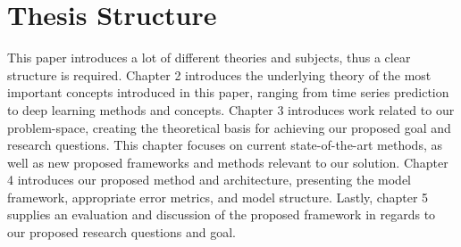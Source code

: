 
\section{Thesis Structure}
\label{sections:Introduction:Structure}

This paper introduces a lot of different theories and subjects,
thus a clear structure is required.
Chapter 2 introduces the underlying theory of the most important concepts introduced in this paper,
ranging from time series prediction to deep learning methods and concepts.
Chapter 3 introduces work related to our problem-space, creating the theoretical basis for achieving our proposed goal and research questions.
This chapter focuses on current state-of-the-art methods,
as well as new proposed frameworks and methods relevant to our solution.
Chapter 4 introduces our proposed method and architecture,
presenting the model framework, appropriate error metrics, and model structure.
Lastly, chapter 5 supplies an evaluation and discussion of the proposed framework in regards to our proposed research questions and goal.


\iffalse
This section provides the reader with an overview of what is coming in the next chapters.
You want to say more than what is explicit in the chapter name,
if possible, but still keep the description short and to the point. 
\fi
